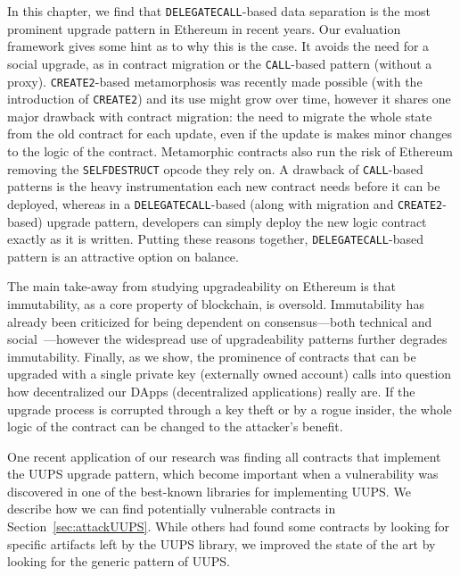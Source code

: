 In this chapter, we find that \texttt{DELEGATECALL}-based data separation is the most prominent upgrade pattern in Ethereum in recent years. Our evaluation framework gives some hint as to why this is the case. It avoids the need for a social upgrade, as in contract migration or the \texttt{CALL}-based pattern (without a proxy). \texttt{CREATE2}-based metamorphosis was recently made possible (with the introduction of \texttt{CREATE2}) and its use might grow over time, however it shares one major drawback with contract migration: the need to migrate the whole state from the old contract for each update, even if the update is makes minor changes to the logic of the contract. Metamorphic contracts also run the risk of Ethereum removing the \texttt{SELFDESTRUCT} opcode they rely on.  A drawback of \texttt{CALL}-based patterns is the heavy instrumentation each new contract needs before it can be deployed, whereas in a \texttt{DELEGATECALL}-based (along with migration and \texttt{CREATE2}-based) upgrade pattern, developers can simply deploy the new logic contract exactly as it is written. Putting these reasons together, \texttt{DELEGATECALL}-based pattern is an attractive option on balance. 


The main take-away from studying upgradeability on Ethereum is that immutability, as a core property of blockchain, is oversold. Immutability has already been criticized for being dependent on consensus---both technical and social~\cite{walch2016path}---however the widespread use of upgradeability patterns further degrades immutability. Finally, as we show, the prominence of contracts that can be upgraded with a single private key (\ie externally owned account) calls into question how decentralized our DApps (decentralized applications) really are. If the upgrade process is corrupted through a key theft or by a rogue insider, the whole logic of the contract can be changed to the attacker's benefit. 

One recent application of our research was finding all contracts that implement the UUPS upgrade pattern, which become important when a vulnerability was discovered in one of the best-known libraries for implementing UUPS. We describe how we can find potentially vulnerable contracts in Section~\ref{sec:attackUUPS}. While others had found some contracts by looking for specific artifacts left by the UUPS library, we improved the state of the art by looking for the generic pattern of UUPS. 

